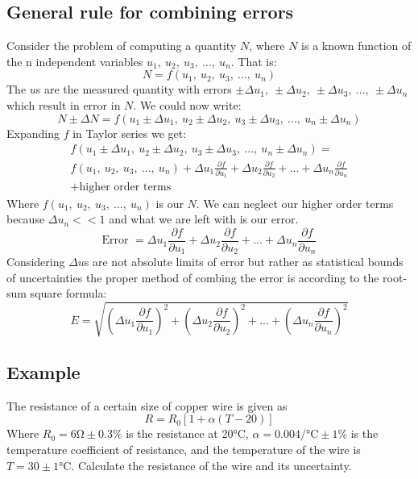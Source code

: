 \subsection{General rule for combining errors}
Consider the problem of computing a quantity $N$, where $N$ is a known function of the n independent variables $u_1, \ u_2, \ u_3, \ ..., \ u_n$. That is:
\begin{equation}
  N = f(u_1, \ u_2, \ u_3, \ ..., \ u_n)
\end{equation}
The $u$s are the measured quantity with errors $\pm \Delta u_1, \ \pm \Delta u_2, \ \pm \Delta u_3, \ ..., \ \pm \Delta u_n$ which result in error in $N$. We could now write:
\begin{equation}
  N \pm \Delta N = f(u_1 \pm \Delta u_1, \ u_2 \pm \Delta u_2, \ u_3 \pm \Delta u_3, \ ..., \ u_n \pm \Delta u_n)
\end{equation}
Expanding $f$ in Taylor series we get:
\begin{multline}
  f(u_1 \pm \Delta u_1, \ u_2 \pm \Delta u_2, \ u_3 \pm \Delta u_3, \ ..., \ u_n \pm \Delta u_n) = \\
  f(u_1, \ u_2, \ u_3, \ ..., \ u_n) + \Delta u_1 \frac{\partial f}{\partial u_1} + \Delta u_2 \frac{\partial f}{\partial u_2} + ... + \Delta u_n \frac{\partial f}{\partial u_n} \\ + \textrm{higher order terms}
\end{multline}
Where $f(u_1, \ u_2, \ u_3, \ ..., \ u_n)$ is our $N$. We can neglect our higher order terms because $\Delta u_n << 1$ and what we are left with is our error.
\begin{equation}
  \textrm{Error } = \Delta u_1 \frac{\partial f}{\partial u_1} + \Delta u_2 \frac{\partial f}{\partial u_2} + ... + \Delta u_n \frac{\partial f}{\partial u_n}
\end{equation}
Considering $\Delta u$s are not absolute limits of error but rather as statistical bounds of uncertainties the proper method of combing the error is according to the root-sum square formula:
\begin{equation}
  E = \sqrt{\left(\Delta u_1 \frac{\partial f}{\partial u_1}\right)^2 + \left(\Delta u_2 \frac{\partial f}{\partial u_2}\right)^2 + ... + \left(\Delta u_n \frac{\partial f}{\partial u_n}\right)^2}
\end{equation}
\subsection{Example}
The resistance of a certain size of copper wire is given as
\begin{equation}
  R = R_0 [1 + \alpha (T-20)]
\end{equation}
Where $R_0 = 6\si{\ohm} \pm 0.3\%$ is the resistance at 20\si{\celsius}, $\alpha = 0.004 \si{\per\celsius} \pm 1\%$ is the temperature coefficient of resistance, and the temperature of the wire is $T = 30 \pm 1 \si{\celsius}$. Calculate the resistance of the wire and its uncertainty.

